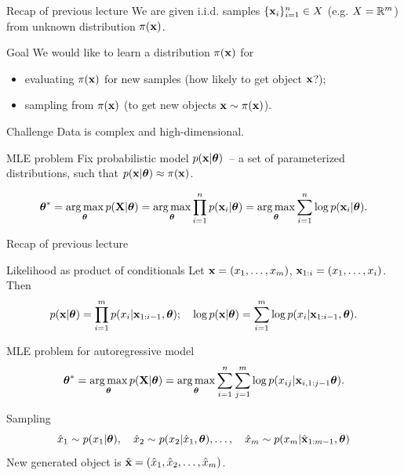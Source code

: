 

\begin{frame}
\titlepage
\end{frame}
\begin{frame}{Recap of previous lecture}
	We are given i.i.d. samples $\{\mathbf{x}_i\}_{i=1}^n \in X$ (e.g. $X = \mathbb{R}^m$) from unknown distribution $\pi(\mathbf{x})$.
	\begin{block}{Goal}
		We would like to learn a distribution $\pi(\mathbf{x})$ for 
		\begin{itemize}
			\item evaluating $\pi(\mathbf{x})$ for new samples (how likely to get object $\mathbf{x}$?);
			\item sampling from $\pi(\mathbf{x})$ (to get new objects $\mathbf{x} \sim \pi(\mathbf{x})$).
		\end{itemize}
	\end{block}
	\begin{block}{Challenge}
		Data is complex and high-dimensional.
	\end{block}
	\begin{block}{MLE problem}
	Fix probabilistic model $p(\mathbf{x} | \boldsymbol{\theta})$~-- a set of parameterized distributions, such that $p(\mathbf{x} | \boldsymbol{\theta}) \approx \pi(\mathbf{x})$.
	
		\vspace{-0.3cm}
		\[
		\boldsymbol{\theta}^* = \operatorname*{arg\,max}_{\boldsymbol{\theta}} p(\mathbf{X} | \boldsymbol{\theta}) = \operatorname*{arg\,max}_{\boldsymbol{\theta}} \prod_{i=1}^n p(\mathbf{x}_i | \boldsymbol{\theta}) = \operatorname*{arg\,max}_{\boldsymbol{\theta}} \sum_{i=1}^n \log p(\mathbf{x}_i | \boldsymbol{\theta}).
		\]
		\vspace{-0.1cm}
	\end{block}
\end{frame}
\begin{frame}{Recap of previous lecture}
	\begin{block}{Likelihood as product of conditionals}
		Let $\mathbf{x} = (x_1, \dots, x_m)$, $\mathbf{x}_{1:i} = (x_1, \dots, x_i)$. Then 
		\[
		p(\mathbf{x} | \boldsymbol{\theta}) = \prod_{i=1}^m p(x_i | \mathbf{x}_{1:i - 1}, \boldsymbol{\theta}); \quad 
		\log p(\mathbf{x} | \boldsymbol{\theta}) = \sum_{i=1}^m \log p(x_i | \mathbf{x}_{1:i - 1}, \boldsymbol{\theta}).
		\]
	\end{block}
	\vspace{-0.3cm}
	\begin{block}{MLE problem for autoregressive model}
		\vspace{-0.5cm}
		\[
		\boldsymbol{\theta}^* = \operatorname*{arg\,max}_{\boldsymbol{\theta}} p(\mathbf{X} | \boldsymbol{\theta}) = \operatorname*{arg\,max}_{\boldsymbol{\theta}} \sum_{i=1}^n \sum_{j=1}^m \log p(x_{ij} | \mathbf{x}_{i, 1:j - 1}\boldsymbol{\theta}).
		\]
		\vspace{-0.5cm}
	\end{block}
	\begin{block}{Sampling}
		\vspace{-0.5cm}
		\[
			\hat{x}_1 \sim p(x_1 | \boldsymbol{\theta}), \quad \hat{x}_2 \sim p(x_2 | \hat{x}_1, \boldsymbol{\theta}), \dots, \quad \hat{x}_m \sim p(x_m | \hat{\mathbf{x}}_{1:m-1}, \boldsymbol{\theta})
		\]
		New generated object is $\hat{\mathbf{x}} = (\hat{x}_1, \hat{x}_2, \dots, \hat{x}_m)$.
	\end{block}
\end{frame}

